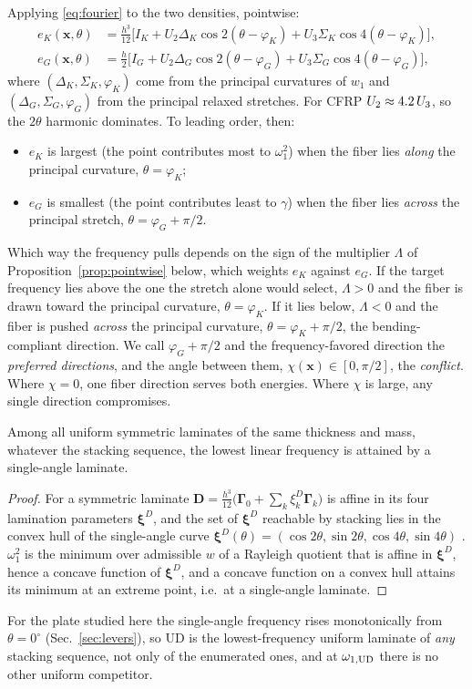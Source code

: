 Applying \eqref{eq:fourier} to the two densities, pointwise:
\begin{align}
e_K(\bm x,\theta)&=\tfrac{h^3}{12}\big[I_K+U_2\Delta_K\cos2(\theta-\varphi_K)+U_3\Sigma_K\cos4(\theta-\varphi_K)\big],
\label{eq:eK}\\
e_G(\bm x,\theta)&=\tfrac{h}{2}\big[I_G+U_2\Delta_G\cos2(\theta-\varphi_G)+U_3\Sigma_G\cos4(\theta-\varphi_G)\big],
\label{eq:eG}
\end{align}
where $(\Delta_K,\Sigma_K,\varphi_K)$ come from the principal curvatures of $w_1$ and
$(\Delta_G,\Sigma_G,\varphi_G)$ from the principal relaxed stretches. For CFRP
$U_2\approx4.2\,U_3$, so the $2\theta$ harmonic dominates. To leading order, then:
\begin{itemize}[itemsep=1pt]
\item $e_K$ is largest (the point contributes most to $\omega_1^2$) when the fiber lies
\emph{along} the principal curvature, $\theta=\varphi_K$;
\item $e_G$ is smallest (the point contributes least to $\gamma$) when the fiber lies
\emph{across} the principal stretch, $\theta=\varphi_G+\pi/2$.
\end{itemize}
Which way the frequency pulls depends on the sign of the multiplier $\Lambda$ of
Proposition~\ref{prop:pointwise} below, which weights $e_K$ against $e_G$. If the target
frequency lies above the one the stretch alone would select, $\Lambda>0$ and the fiber is
drawn toward the principal curvature, $\theta=\varphi_K$. If it lies below, $\Lambda<0$
and the fiber is pushed \emph{across} the principal curvature, $\theta=\varphi_K+\pi/2$,
the bending-compliant direction. We call $\varphi_G+\pi/2$ and the frequency-favored
direction the \emph{preferred directions}, and the angle between them,
$\chi(\bm x)\in[0,\pi/2]$, the \emph{conflict}. Where $\chi=0$, one fiber direction
serves both energies. Where $\chi$ is large, any single direction compromises.

\begin{corollary}\label{cor:udfloor}
Among all uniform symmetric laminates of the same thickness and mass, whatever the
stacking sequence, the lowest linear frequency is attained by a single-angle laminate.
\end{corollary}
\begin{proof}
For a symmetric laminate $\bm D=\tfrac{h^3}{12}\big(\bm\Gamma_0+\sum_k\xi^D_k\bm\Gamma_k\big)$ is affine
in its four lamination parameters $\bm\xi^D$, and the set of $\bm\xi^D$ reachable by
stacking lies in the convex hull of the single-angle curve
$\bm\xi^D(\theta)=(\cos2\theta,\sin2\theta,\cos4\theta,\sin4\theta)$ \cite{tsai1968}.
$\omega_1^2$ is the minimum over admissible $w$ of a Rayleigh quotient that is affine in
$\bm\xi^D$, hence a concave function of $\bm\xi^D$, and a concave function on a convex
hull attains its minimum at an extreme point, i.e.\ at a single-angle laminate.
\end{proof}
\noindent For the plate studied here the single-angle frequency rises monotonically from
$\theta=0^\circ$ (Sec.~\ref{sec:levers}), so UD is the lowest-frequency uniform laminate of
\emph{any} stacking sequence, not only of the enumerated ones, and at $\omega_{1,\mathrm{UD}}$ there
is no other uniform competitor.

